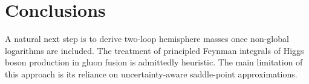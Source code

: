 \section{Conclusions}\label{sec:conclusions}

A natural next step is to derive two-loop hemisphere masses once
non-global logarithms are included. The treatment of principled Feynman
integrals of Higgs boson production in gluon fusion is admittedly
heuristic. The main limitation of this approach is its reliance on
uncertainty-aware saddle-point approximations.

